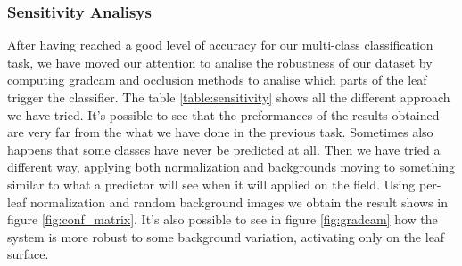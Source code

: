 \subsubsection{Sensitivity Analisys}
After having reached a good level of accuracy for our multi-class classification task, we have moved our attention to analise the robustness of our dataset by computing gradcam and occlusion methods to analise which parts of the leaf trigger the classifier. The table \ref{table:sensitivity} shows all the different approach we have tried. It's possible to see that the preformances of the results obtained are very far from the what we have done in the previous task. Sometimes also happens that some classes have never be predicted at all. Then we have tried a different way, applying both normalization and backgrounds moving to something similar to what a predictor will see when it will applied on the field. Using per-leaf normalization and random background images we obtain the result shows in figure \ref{fig:conf_matrix}. It's also possible to see in figure \ref{fig:gradcam} how the system is more robust to some background variation, activating only on the leaf surface.
